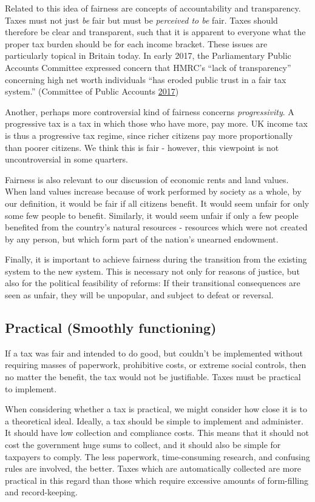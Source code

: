 \documentclass[]{tufte-handout}
\begin{document}
Related to this idea of fairness are concepts of accountability and
transparency. Taxes must not just \emph{be} fair but must be
\emph{perceived to be} fair. Taxes should therefore be clear and
transparent, such that it is apparent to everyone what the proper tax
burden should be for each income bracket. These issues are particularly
topical in Britain today. In early 2017, the Parliamentary Public
Accounts Committee expressed concern that HMRC's ``lack of
transparency'' concerning high net worth individuals ``has eroded public
trust in a fair tax system.'' (Committee of Public Accounts
\protect\hyperlink{ref-HoC2017}{2017})

Another, perhaps more controversial kind of fairness concerns
\emph{progressivity}. A progressive tax is a tax in which those who have
more, pay more. UK income tax is thus a progressive tax regime, since
richer citizens pay more proportionally than poorer citizens. We think
this is fair - however, this viewpoint is not uncontroversial in some
quarters.

Fairness is also relevant to our discussion of economic rents and land
values. When land values increase because of work performed by society
as a whole, by our definition, it would be fair if all citizens benefit.
It would seem unfair for only some few people to benefit. Similarly, it
would seem unfair if only a few people benefited from the country's
natural resources - resources which were not created by any person, but
which form part of the nation's unearned endowment.

Finally, it is important to achieve fairness during the transition from
the existing system to the new system. This is necessary not only for
reasons of justice, but also for the political feasibility of reforms:
If their transitional consequences are seen as unfair, they will be
unpopular, and subject to defeat or reversal.

\hypertarget{practical-smoothly-functioning}{%
\subsection{Practical (Smoothly
functioning)}\label{practical-smoothly-functioning}}

If a tax was fair and intended to do good, but couldn't be implemented
without requiring masses of paperwork, prohibitive costs, or extreme
social controls, then no matter the benefit, the tax would not be
justifiable. Taxes must be practical to implement.

When considering whether a tax is practical, we might consider how close
it is to a theoretical ideal. Ideally, a tax should be simple to
implement and administer. It should have low collection and compliance
costs. This means that it should not cost the government huge sums to
collect, and it should also be simple for taxpayers to comply. The less
paperwork, time-consuming research, and confusing rules are involved,
the better. Taxes which are automatically collected are more practical
in this regard than those which require excessive amounts of
form-filling and record-keeping.
\end{document}
